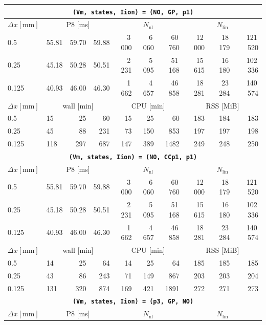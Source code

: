 \documentclass[11pt,a4paper]{article}
\newcommand{\code}[1]{\texttt{\small #1}}
\begin{document}
\begin{center}
\begin{longtable}{l|lrr|rrr|rrr}
\hline
\hline
\multicolumn{10}{c}{\textbf{\code{(Vm, states, Iion) = (NO, GP, p1)}}}\\\hline
$ \Delta x [\text{mm}] $ & \multicolumn{3}{c|}{P8 [ms]} & \multicolumn{3}{c|}{$N_{\mathrm{nl}}$} & \multicolumn{3}{c|}{$N_{\mathrm{lin}}$}\\
0.5 & 55.81 & 59.70 & 59.88 & 3\,000 & 6\,060 & 60\,760 & 12\,000 & 18\,179 & 121\,520\\
0.25 & 45.18 & 50.28 & 50.51 & 2\,231 & 5\,095 & 51\,168 & 15\,615 & 16\,180 & 102\,336\\
0.125 & 40.93 & 46.00 & 46.30 & 1\,662 & 4\,657 & 46\,858 & 18\,281 & 23\,284 & 140\,574\\
\hline
$ \Delta x [\text{mm}] $ & \multicolumn{3}{c|}{wall [min]} & \multicolumn{3}{c|}{CPU [min]} & \multicolumn{3}{c|}{RSS [MiB]}\\
0.5 & 15 & 25 & 60 & 15 & 25 & 60 & 183 & 184 & 183\\
0.25 & 45 & 88 & 231 & 73 & 150 & 853 & 197 & 197 & 198\\
0.125 & 118 & 297 & 687 & 147 & 389 & 1482 & 249 & 248 & 250\\
\hline
\hline
\multicolumn{10}{c}{\textbf{\code{(Vm, states, Iion) = (NO, CCp1, p1)}}}\\\hline
$ \Delta x [\text{mm}] $ & \multicolumn{3}{c|}{P8 [ms]} & \multicolumn{3}{c|}{$N_{\mathrm{nl}}$} & \multicolumn{3}{c|}{$N_{\mathrm{lin}}$}\\
0.5 & 55.81 & 59.70 & 59.88 & 3\,000 & 6\,060 & 60\,760 & 12\,000 & 18\,179 & 121\,520\\
0.25 & 45.18 & 50.28 & 50.51 & 2\,231 & 5\,095 & 51\,168 & 15\,615 & 16\,180 & 102\,336\\
0.125 & 40.93 & 46.00 & 46.30 & 1\,662 & 4\,657 & 46\,858 & 18\,281 & 23\,284 & 140\,574\\
\hline
$ \Delta x [\text{mm}] $ & \multicolumn{3}{c|}{wall [min]} & \multicolumn{3}{c|}{CPU [min]} & \multicolumn{3}{c|}{RSS [MiB]}\\
0.5 & 14 & 25 & 64 & 14 & 25 & 64 & 185 & 185 & 185\\
0.25 & 43 & 86 & 243 & 71 & 149 & 867 & 203 & 203 & 204\\
0.125 & 131 & 320 & 874 & 169 & 421 & 1891 & 272 & 271 & 273\\
\hline
\hline
\multicolumn{10}{c}{\textbf{\code{(Vm, states, Iion) = (p3, GP, NO)}}}\\\hline
$ \Delta x [\text{mm}] $ & \multicolumn{3}{c|}{P8 [ms]} & \multicolumn{3}{c|}{$N_{\mathrm{nl}}$} & \multicolumn{3}{c|}{$N_{\mathrm{lin}}$}\\

\end{longtable}
\end{center}
\end{document}

